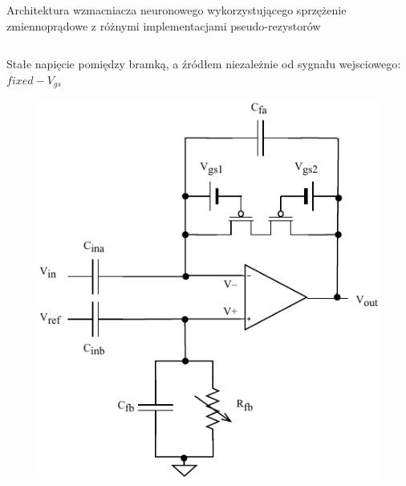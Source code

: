 \begin{frame}{Architektura wzmacniacza neuronowego wykorzystującego sprzężenie zmiennoprądowe z różnymi implementacjami pseudo-rezystorów}
\begin{columns}[t]
        \begin{exampleblock}{Stałe napięcie pomiędzy bramką, a źródłem niezależnie od sygnału wejsciowego: $fixed-V_{gs}$}
            \begin{figure}[H]
                \centering
                \includegraphics[scale = 0.55]{Figures/project.pdf}
            \end{figure}
        \end{exampleblock}

    \end{columns}
\end{frame}

